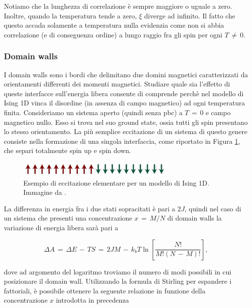 Notiamo che la lunghezza di correlazione è sempre maggiore o uguale a zero. Inoltre, quando la temperatura tende a zero, 
$\xi$ diverge ad infinito. Il fatto che questo accada solamente a temperatura nulla evidenzia come non si abbia correlazione 
(e di conseguenza ordine) a lungo raggio fra gli spin per ogni $T\,\neq\,0$.



\subsubsection{Domain walls}

I domain walls sono i bordi che delimitano due domini magnetici caratterizzati da orientamenti differenti dei momenti magnetici. 
Studiare quale sia l'effetto di queste interfacce sull'energia libera consente di comprende perchè nel modello di Ising 1D vinca il 
disordine (in assenza di campo magnetico) ad ogni temperatura finita. Consideriamo un sistema aperto (quindi senza pbc) a $T\,=\,0$ 
e campo magnetico nullo. Esso si trova nel suo ground state, ossia tutti gli spin presentano lo stesso orientamento. La più semplice 
eccitazione di un sistema di questo genere consiste nella formazione di una singola interfaccia, come riportato in Figura 
\ref{fig: dw_Ising1D}, che separi totalmente spin up e spin down.

\begin{figure}[H]
    \centering
    \includegraphics[width=0.7\textwidth]{Immagini/dw_Ising1D.png}
    \caption{Esempio di eccitazione elementare per un modello di Ising 1D. Immagine da \cite{galliFSA}.}
    \label{fig: dw_Ising1D}
\end{figure}

La differenza in energia fra i due stati sopracitati è pari a $2 J$, quindi nel caso di un sistema che presenti una concentrazione 
$x\,=\,M/N$ di domain walls la variazione di energia libera sarà pari a 

\begin{equation}
    \Delta A\,=\,\Delta E\,-\,TS\,=\,2JM\,-\,k_bT\ln{\left[\frac{N!}{M!\left(N\,-\,M\right)!}\right]},
    \label{eq: freeE_dw1_Ising1D}
\end{equation}

dove ad argomento del logaritmo troviamo il numero di modi possibili in cui posizionare il domain wall. Utilizzando la 
formula di Stirling per espandere i fattoriali, è possibile ottenere la seguente relazione in funzione della concentrazione 
$x$ introdotta in precedenza

